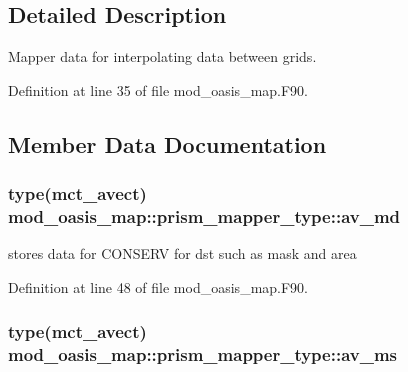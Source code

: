 \subsection{Detailed Description}
Mapper data for interpolating data between grids. 

Definition at line 35 of file mod\+\_\+oasis\+\_\+map.\+F90.



\subsection{Member Data Documentation}
\hypertarget{structmod__oasis__map_1_1prism__mapper__type_a3ff54ff3819cd06df5d6a9f9d993cb21}{
\subsubsection[{av\+\_\+md}]{\setlength{\rightskip}{0pt plus 5cm}type(mct\+\_\+avect) mod\+\_\+oasis\+\_\+map\+::prism\+\_\+mapper\+\_\+type\+::av\+\_\+md\hspace{0.3cm}{\ttfamily [private]}}}\label{structmod__oasis__map_1_1prism__mapper__type_a3ff54ff3819cd06df5d6a9f9d993cb21}


stores data for C\+O\+N\+S\+E\+R\+V for dst such as mask and area 



Definition at line 48 of file mod\+\_\+oasis\+\_\+map.\+F90.

\hypertarget{structmod__oasis__map_1_1prism__mapper__type_a428a70b5f90d592638e1eaf55c56baae}{
\subsubsection[{av\+\_\+ms}]{\setlength{\rightskip}{0pt plus 5cm}type(mct\+\_\+avect) mod\+\_\+oasis\+\_\+map\+::prism\+\_\+mapper\+\_\+type\+::av\+\_\+ms\hspace{0.3cm}{\ttfamily [private]}}}\label{structmod__oasis__map_1_1prism__mapper__type_a428a70b5f90d592638e1eaf55c56baae}


